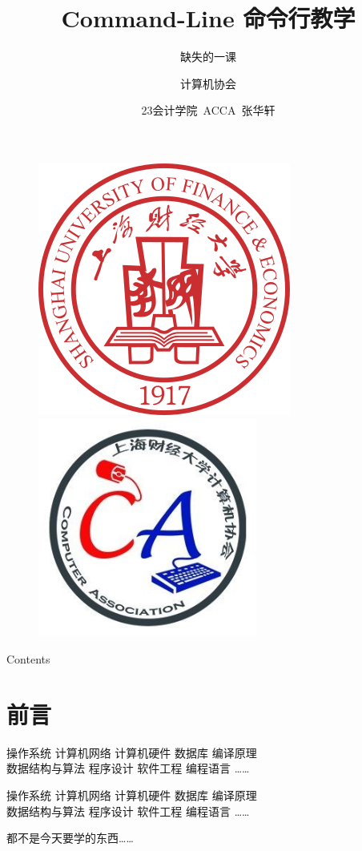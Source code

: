 \documentclass[UTF8, 16pt]{beamer}
\author[计算机协会] %
{
计算机协会
}
\title[Command-Line 命令行教学]{Command-Line 命令行教学}
\subtitle{缺失的一课}
\institute[SUFE]
{
上海财经大学
}
\date{23会计学院\ ACCA\ 张华轩}
\begin{document}
\begin{frame}[noframenumbering]
    \titlepage{}
    \vspace{-0.5cm}
    \begin{figure}[htpb]
        \begin{center}
            \includegraphics[width=0.19 \linewidth]{sufe_logo.png}
            \quad
            \includegraphics[width=0.19 \linewidth]{ca_logo.png}
        \end{center}
    \end{figure}
\end{frame}

\begin{frame}{Contents}
    \tableofcontents[sectionstyle=show,
        subsectionstyle=show/shaded/hide,
        subsubsectionstyle=show/shaded/hide]
\end{frame}

\section{前言}

\begin{frame}
    \textcolor{sufered}{
        操作系统 \quad
        计算机网络 \quad
        计算机硬件 \quad
        数据库 \quad
        编译原理 \\
        数据结构与算法 \quad
        程序设计 \quad
        软件工程 \quad
        编程语言 \quad
        \dots\dots
    }
\end{frame}

\begin{frame}
    \textcolor{sufered}{
        操作系统 \quad
        计算机网络 \quad
        计算机硬件 \quad
        数据库 \quad
        编译原理 \\
        数据结构与算法 \quad
        程序设计 \quad
        软件工程 \quad
        编程语言 \quad
        \dots\dots
    }

    都不是今天要学的东西\dots\dots
\end{frame}
\end{document}
